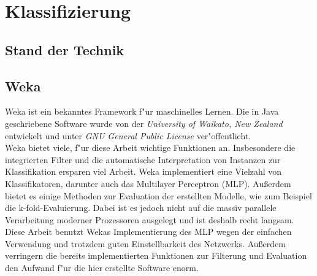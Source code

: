 \section{Klassifizierung}
\label{Klassifizierung}

\subsection{Stand der Technik}
\label{Stand der Technik}

\subsection{Weka}
\label{Weka}
Weka ist ein bekanntes Framework f"ur maschinelles Lernen. Die in Java geschriebene Software wurde von der \textit{University of Waikato, New Zealand} entwickelt und unter \textit{GNU General Public License} ver"offentlicht. \\
Weka bietet viele, f"ur diese Arbeit wichtige Funktionen an. Insbesondere die integrierten Filter und die automatische Interpretation von Instanzen zur Klassifikation ersparen viel Arbeit. Weka implementiert eine Vielzahl von Klassifikatoren, darunter auch das Multilayer Perceptron (MLP).
Au{\ss}erdem bietet es einige Methoden zur Evaluation der erstellten Modelle, wie zum Beispiel die k-fold-Evaluierung. Dabei ist es jedoch nicht auf die massiv parallele Verarbeitung moderner Prozessoren ausgelegt und ist deshalb recht langsam.\\
Diese Arbeit benutzt Wekas Implementierung des MLP wegen der einfachen Verwendung und trotzdem guten Einstellbarkeit des Netzwerks. Au{\ss}erdem verringern die bereits implementierten Funktionen zur Filterung und Evaluation den Aufwand f"ur die hier erstellte Software enorm.

